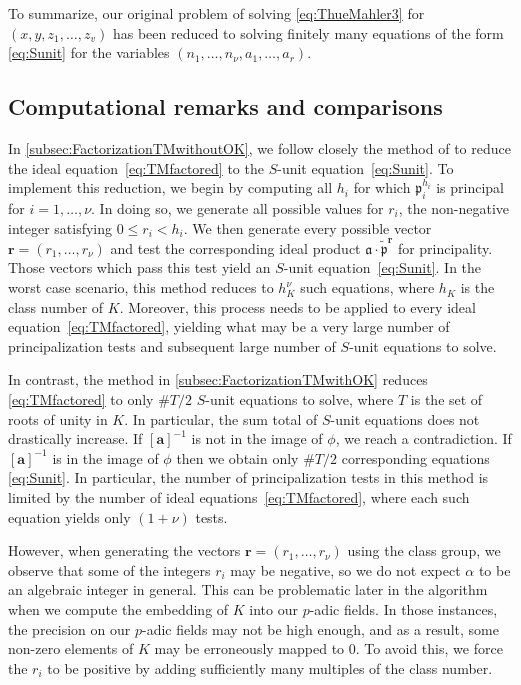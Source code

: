 \documentclass[11pt]{report}
\theoremstyle{definition}
\begin{document}
To summarize, our original problem of solving \eqref{eq:ThueMahler3} for $(x,y,z_1,\dots, z_v)$ has been reduced to solving finitely many equations of the form \eqref{eq:Sunit} for the variables $( n_1, \dots, n_{\nu},a_1,\dots,a_r)$.


\subsection{Computational remarks and comparisons}
\label{subsec:FactorizationRemarks}

In \autoref{subsec:FactorizationTMwithoutOK}, we follow closely the method of \cite{TW3} to reduce the ideal equation~\eqref{eq:TMfactored} to the $S$-unit equation~\eqref{eq:Sunit}. To implement this reduction, we begin by computing all $h_i$ for which $\mathfrak{p}_i^{h_i}$ is principal for $i = 1, \dots, \nu$. In doing so, we generate all possible values for $r_i$, the non-negative integer satisfying $0 \leq r_i < h_i$. We then generate every possible vector $\mathbf{r} = (r_1, \dots, r_{\nu})$ and test the corresponding ideal product $\mathfrak{a} \cdot \tilde{\mathfrak{p}}^{\mathbf{r}}$ for principality. Those vectors which pass this test yield an $S$-unit equation~\eqref{eq:Sunit}. In the worst case scenario, this method reduces to $h_K^{\nu}$ such equations, where $h_K$ is the class number of $K$. Moreover, this process needs to be applied to every ideal equation~\eqref{eq:TMfactored}, yielding what may be a very large number of principalization tests and subsequent large number of $S$-unit equations to solve.

In contrast, the method in \autoref{subsec:FactorizationTMwithOK} reduces \eqref{eq:TMfactored} to only $\#T/2$ $S$-unit equations to solve, where $T$ is the set of roots of unity in $K$. In particular, the sum total of $S$-unit equations does not drastically increase. If $[\mathbf{a}]^{-1}$ is not in the image of $\phi$, we reach a contradiction. If $[\mathbf{a}]^{-1}$ is in the image of $\phi$ then we obtain only $\#T/2$ corresponding equations \eqref{eq:Sunit}. In particular, the number of principalization tests in this method is limited by the number of ideal equations~\eqref{eq:TMfactored}, where each such equation yields only $(1+\nu)$ tests.

However, when generating the vectors $\mathbf{r} = (r_1, \dots, r_{\nu})$ using the class group, we observe that some of the integers $r_i$ may be negative, so we do not expect $\alpha$ to be an algebraic integer in general. This can be problematic later in the algorithm when we compute the embedding of $K$ into our $p$-adic fields. In those instances, the precision on our $p$-adic fields may not be high enough, and as a result, some non-zero elements of $K$ may be erroneously mapped to $0$. To avoid this, we force the $r_i$ to be positive by adding sufficiently many multiples of the class number.
\end{document}
